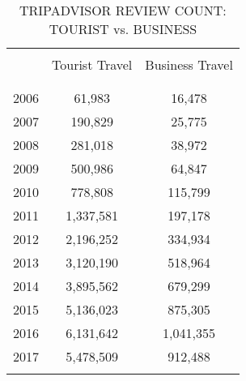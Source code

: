 \begin{table}[!htbp] \centering
  \caption{TRIPADVISOR REVIEW COUNT: TOURIST vs. BUSINESS}
  \label{tab:ta_exp_biz}
  \begin{tabular}{ccc}
  \hline 
  \hline
\\[-1.8ex]   
 & Tourist Travel       & Business Travel       \\
\\[-1.8ex] 
	\hline
    \\[-1.8ex] 
 2006	&	61,983	&	16,478	\\
2007	&	190,829	&	25,775	\\
2008	&	281,018	&	38,972	\\
2009	&	500,986	&	64,847	\\
2010	&	778,808	&	115,799	\\
2011	&	1,337,581	&	197,178	\\
2012	&	2,196,252	&	334,934	\\
2013	&	3,120,190	&	518,964	\\
2014	&	3,895,562	&	679,299	\\
2015	&	5,136,023	&	875,305	\\
2016	&	6,131,642	&	1,041,355	\\
2017	&	5,478,509	&	912,488	\\
\\[-1.8ex] 
\hline 
\hline         
 \end{tabular}
\end{table}